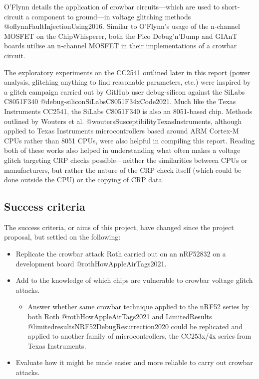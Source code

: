 O'Flynn details the application of crowbar circuits---which are used to
short-circuit a component to ground---in voltage glitching methods
@oflynnFaultInjectionUsing2016. Similar to O'Flynn's usage of the
n-channel MOSFET on the ChipWhisperer, both the Pico Debug'n'Dump and
GIAnT boards utilise an n-channel MOSFET in their implementations of a
crowbar circuit.

The exploratory experiments on the CC2541 outlined later in this report
(power analysis, glitching anything to find reasonable parameters, etc.)
were inspired by a glitch campaign carried out by GitHub user
debug-silicon against the SiLabs C8051F340
@debug-siliconSiLabsC8051F34xCode2021. Much like the Texas Instruments
CC2541, the SiLabs C8051F340 is also an 8051-based chip. Methods
outlined by Wouters et al. @woutersSusceptibilityTexasInstruments,
although applied to Texas Instruments microcontrollers based around ARM
Cortex-M CPUs rather than 8051 CPUs, were also helpful in compiling this
report. Reading both of these works also helped in understanding what
often makes a voltage glitch targeting CRP checks possible---neither the
similarities between CPUs or manufacturers, but rather the nature of the
CRP check itself (which could be done outside the CPU) or the copying of
CRP data.

\hypertarget{success-criteria}{%
\subsection{Success criteria}\label{success-criteria}}

The success criteria, or aims of this project, have changed since the
project proposal, but settled on the following:

\begin{itemize}
\tightlist
\item
  Replicate the crowbar attack Roth carried out on an nRF52832 on a
  development board @rothHowAppleAirTags2021.
\item
  Add to the knowledge of which chips are vulnerable to crowbar voltage
  glitch attacks.

  \begin{itemize}
  \tightlist
  \item
    Answer whether same crowbar technique applied to the nRF52 series by
    both Roth @rothHowAppleAirTags2021 and LimitedResults
    @limitedresultsNRF52DebugResurrection2020 could be replicated and
    applied to another family of microcontrollers, the CC253x/4x series
    from Texas Instruments.
  \end{itemize}
\item
  Evaluate how it might be made easier and more reliable to carry out
  crowbar attacks.
\end{itemize}

